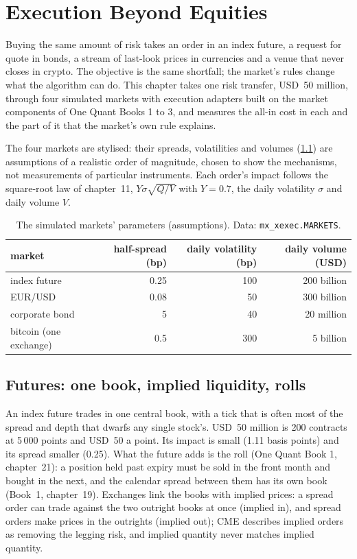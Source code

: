 \chapter{Execution Beyond Equities}\label{ch:mx:execution-beyond-equities}

Buying the same amount of risk takes an order in an index future, a request for quote in bonds, a stream of last-look prices in currencies and a venue
that never closes in crypto. The objective is the same shortfall; the market's rules change what the algorithm can do. This chapter takes one risk
transfer, USD~50 million, through four simulated markets with execution adapters built on the market components of One Quant Books 1 to 3, and
measures the all-in cost in each and the part of it that the market's own rule explains.

The four markets are stylised: their spreads, volatilities and volumes (\cref{tab:mx:execution-beyond-equities:markets}) are assumptions of a
realistic order of magnitude, chosen to show the mechanisms, not measurements of particular instruments. Each order's impact follows the square-root
law of chapter~11, $Y\sigma\sqrt{Q/V}$ with $Y=0.7$, the daily volatility $\sigma$ and daily volume $V$.

\begin{table}[ht]
\centering
\small
\begin{tabular}{@{}lrrr@{}}
\toprule
market & half-spread (bp) & daily volatility (bp) & daily volume (USD) \\
\midrule
index future & 0.25 & 100 & 200 billion \\
EUR/USD & 0.08 & 50 & 300 billion \\
corporate bond & 5 & 40 & 20 million \\
bitcoin (one exchange) & 0.5 & 300 & 5 billion \\
\bottomrule
\end{tabular}
\caption{The simulated markets' parameters (assumptions). Data: \texttt{mx\_xexec.MARKETS}.}\label{tab:mx:execution-beyond-equities:markets}
\end{table}

\section{Futures: one book, implied liquidity, rolls}

An index future trades in one central book, with a tick that is often most of the spread and depth that dwarfs any single stock's. USD~50 million is
200 contracts at 5\,000 points and USD~50 a point. Its impact is small (1.11 basis points) and its spread smaller (0.25). What the future adds is the roll
(One Quant Book 1, chapter~21): a position held past expiry must be sold in the front month and bought in the next, and the calendar spread between
them has its own book (Book~1, chapter~19). Exchanges link the books with implied prices: a spread order can trade against the two outright books at
once (implied in), and spread orders make prices in the outrights (implied out); CME describes implied orders as removing the legging risk, and implied
quantity never matches implied quantity.

